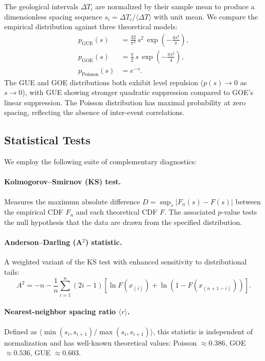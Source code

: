 \documentclass[12pt,a4paper]{article}
\begin{document}
The geological intervals $\Delta T_i$ are normalized by their sample mean to produce a dimensionless spacing sequence $s_i = \Delta T_i / \langle\Delta T\rangle$ with unit mean. We compare the empirical distribution against three theoretical models:
\begin{align}
    p_{\text{GUE}}(s) &= \frac{32}{\pi^2}\, s^2\, \exp\!\left(-\frac{4s^2}{\pi}\right), \label{eq:gue} \\[4pt]
    p_{\text{GOE}}(s) &= \frac{\pi}{2}\, s\, \exp\!\left(-\frac{\pi s^2}{4}\right), \label{eq:goe} \\[4pt]
    p_{\text{Poisson}}(s) &= e^{-s}. \label{eq:poisson}
\end{align}
The GUE and GOE distributions both exhibit level repulsion ($p(s) \to 0$ as $s \to 0$), with GUE showing stronger quadratic suppression compared to GOE's linear suppression. The Poisson distribution has maximal probability at zero spacing, reflecting the absence of inter-event correlations.

\subsection{Statistical Tests}

We employ the following suite of complementary diagnostics:

\paragraph{Kolmogorov--Smirnov (KS) test.} Measures the maximum absolute difference $D = \sup_s |F_n(s) - F(s)|$ between the empirical CDF $F_n$ and each theoretical CDF $F$. The associated $p$-value tests the null hypothesis that the data are drawn from the specified distribution.

\paragraph{Anderson--Darling (A$^2$) statistic.} A weighted variant of the KS test with enhanced sensitivity to distributional tails:
\begin{equation}
    A^2 = -n - \frac{1}{n}\sum_{i=1}^{n} (2i-1)\left[\ln F(x_{(i)}) + \ln\!\left(1 - F(x_{(n+1-i)})\right)\right].
\end{equation}

\paragraph{Nearest-neighbor spacing ratio $\langle r \rangle$.} Defined as $\langle \min(s_i, s_{i+1}) / \max(s_i, s_{i+1}) \rangle$, this statistic is independent of normalization and has well-known theoretical values: Poisson $\approx 0.386$, GOE $\approx 0.536$, GUE $\approx 0.603$.
\end{document}

